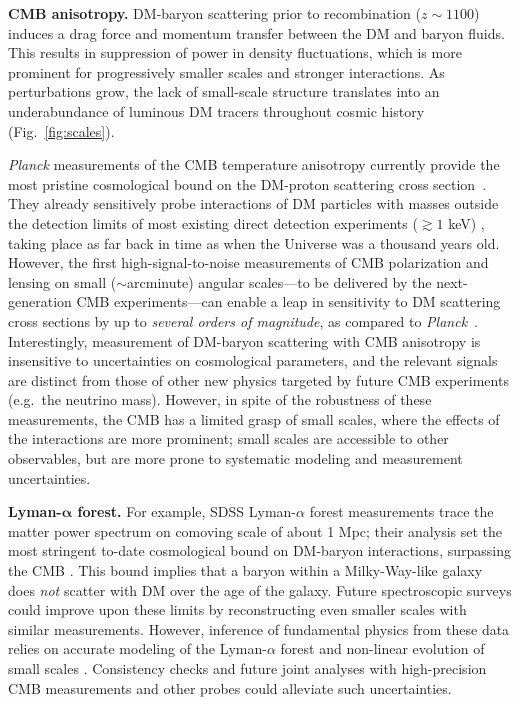 \documentclass[12pt]{article}
\begin{document}
\textbf{CMB anisotropy.} 
DM-baryon scattering prior to recombination ($z\sim 1100$) induces a drag force and momentum transfer between the DM and baryon fluids. 
This results in suppression of power in density fluctuations, which is more prominent for progressively smaller scales and stronger interactions.
As perturbations grow, the lack of small-scale structure translates into an underabundance of luminous DM tracers throughout cosmic history (Fig.~\ref{fig:scales}).

\textit{Planck} measurements of the CMB temperature anisotropy currently provide the most pristine cosmological bound on the DM-proton scattering cross section~\cite{Boddy:2018kfv,Gluscevic:2017ywp,Boddy:2018wzy,Xu:2018efh,Slatyer:2018aqg,Dvorkin:2013cea}.
They already sensitively probe interactions of DM particles with masses outside the detection limits of most existing direct detection experiments ($\gtrsim 1$ keV) \cite{Gluscevic:2017ywp}, taking place as far back in time as when the Universe was a thousand years old.
However, the first high-signal-to-noise measurements of CMB polarization and lensing on small ($\sim$arcminute) angular scales---to be delivered by the next-generation CMB experiments---can enable a leap in sensitivity to DM scattering cross sections by up to \textit{several orders of magnitude}, as compared to \textit{Planck}~\cite{2018PhRvD..98l3524L,2019JCAP...02..056A,Abazajian:2016yjj,2019arXiv190210541H}.
Interestingly, measurement of DM-baryon scattering with CMB anisotropy is insensitive to uncertainties on cosmological parameters, and the relevant signals are distinct from those of other new physics targeted by future CMB experiments (e.g.~the neutrino mass). 
However, in spite of the robustness of these measurements, the CMB has a limited grasp of small scales, where the effects of the interactions are more prominent; small scales are accessible to other observables, but are more prone to systematic modeling and measurement uncertainties.

\textbf{Lyman-${\boldsymbol\alpha}$ forest.} 
For example, SDSS Lyman-$\alpha$ forest measurements trace the matter power spectrum on comoving scale of about 1 Mpc; their analysis set the most stringent to-date cosmological bound on DM-baryon interactions, surpassing the CMB  \cite{Xu:2018efh,Dvorkin:2013cga}.
This bound implies that a baryon within a Milky-Way-like galaxy does \textit{not} scatter with DM over the age of the galaxy.
Future spectroscopic surveys could improve upon these limits by reconstructing even smaller scales with similar measurements.
However, inference of fundamental physics from these data relies on accurate modeling of the Lyman-$\alpha$ forest and non-linear evolution of small scales \cite{2017PhRvD..96b3522I}.
Consistency checks and future joint analyses with high-precision CMB measurements and other probes could alleviate such uncertainties.
\end{document}
